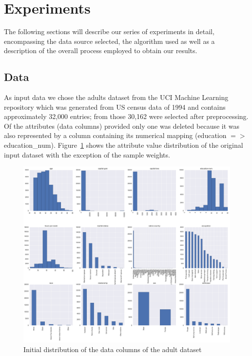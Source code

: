 \documentclass{llncs}
\begin{document}
\section{Experiments}
\label{sect:experiments}

The following sections will describe our series of experiments in detail, encompassing the data source selected, the algorithm used as well as a description of the overall process employed to obtain our results.


\subsection{Data} 
\label{ssect:data}

As input data we chose the adults dataset from the UCI Machine Learning repository which was generated from US census data of 1994 and contains approximately 32,000 entries; from those 30,162 were selected after preprocessing. Of the attributes (data columns) provided only one was deleted because it was also represented by a column containing its numerical mapping (education $=>$ education\_num). Figure~\ref{fig:adult_original_distribution} shows the attribute value distribution of the original input dataset with the exception of the sample weights.


\begin{figure}[!t]
	\begin{center}
    \hspace*{-1cm}
		\includegraphics[width=1.2\textwidth]{figures/experiment/initial_distribution}
		\caption{Initial distribution of the data columns of the adult dataset}
		\label{fig:adult_original_distribution}
	\end{center}
\end{figure}
\end{document}
